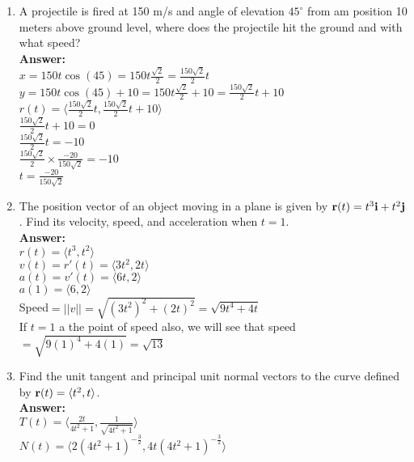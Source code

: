 \documentclass[11pt]{article}
\begin{document}
\begin{enumerate}
    
    \item A projectile is fired at 150 m/s and angle of elevation $45^\circ$ from am position 10 meters above ground level,  where does the projectile hit the ground and with what speed?
    \\
    \textbf{Answer:}
    \\
    $x=150t \cos (45)=150t \frac{\sqrt{2}}{2}=\frac{150\sqrt{2}}{2}t$
    \\
    $y=150t \cos(45)+10=150t \frac{\sqrt{2}}{2}+10= \frac{150\sqrt{2}}{2}t+10$
    \\
    $r(t)= \langle \frac{150\sqrt{2}}{2}t, \frac{150\sqrt{2}}{2}t+10 \rangle $
    \\
    $\frac{150\sqrt{2}}{2}t+10=0$
    \\
    $\frac{150\sqrt{2}}{2}t=-10$
    \\
    $\frac{150\sqrt{2}}{2} \times \frac{-20}{150\sqrt{2}}=-10$
    \\
    $t=\frac{-20}{150 \sqrt{2}}$
    
    
    
    \item The position vector of an object moving in a plane is given by ${\bf r}(t) = t^3 {\bf i} + t^2 {\bf j}$.  Find its velocity, speed, and acceleration when $t=1$. 
    \\
    \textbf{Answer:}
    \\
    $r(t)=\langle t^3, t^2 \rangle$
    \\
    $v(t)=r'(t)=\langle 3t^2, 2t \rangle$
    \\
    $a(t)=v'(t)=\langle 6t, 2 \rangle $
    \\
    $a(1)= \langle 6,2 \rangle$
    \\
    Speed$=||v||=\sqrt{(3t^2)^2+(2t)^2}=\sqrt{9t^4+4t}$
    \\
    If $t=1$ a the point of speed also, we will see that speed$=\sqrt{9(1)^4+4(1)}=\sqrt{13}$
    
    
    
    \item Find the unit tangent and principal unit normal vectors to the curve defined by ${\bf r}(t) = \langle t^2, t \rangle$.  
    \\
    \textbf{Answer:}
    \\
    $T(t)=  \langle \frac{2t}{4t^2+1}, \frac{1}{\sqrt{4t^2+1}} \rangle$
    \\
    $N(t)= \langle 2 (4t^2+1)^{-\frac{3}{2}}, 4t (4t^2+1)^{-\frac{3}{2}} \rangle$
    

\end{enumerate}
\end{document}
